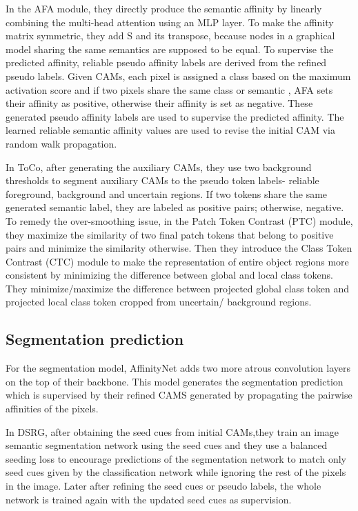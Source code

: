 In the AFA module, they directly produce the semantic affinity by linearly combining the multi-head attention using an MLP layer. To make the affinity matrix symmetric, they add S and its transpose, because  nodes in a graphical model sharing the same semantics are supposed to be equal. To supervise the predicted affinity, reliable pseudo affinity labels  are derived from the refined pseudo labels. Given CAMs, each pixel is assigned a class based on the maximum activation score and if two pixels share the same class or semantic , AFA sets their affinity as positive, otherwise their affinity is set as negative. These generated pseudo affinity labels are used to supervise the predicted affinity. The learned reliable semantic affinity values are used to revise the initial CAM via random walk propagation.

In ToCo, after generating the auxiliary CAMs, they use two background thresholds to segment auxiliary CAMs to the pseudo token labels- reliable foreground, background and uncertain regions. If two tokens share the same generated semantic label, they are labeled as positive pairs; otherwise, negative. To remedy the over-smoothing issue, in the Patch Token Contrast (PTC) module, they maximize the similarity of two final patch tokens that belong to positive pairs and minimize the similarity otherwise. Then they introduce the Class Token Contrast (CTC) module to make the representation of entire object regions more consistent by minimizing the difference between global and local class tokens. They minimize/maximize the difference between projected global class token and projected local class token cropped from uncertain/ background regions.


\subsection{Segmentation prediction}
\label{subsec:segmentation-prediction}

For the segmentation model, AffinityNet adds two more atrous convolution layers on the top of their backbone. This model generates the segmentation prediction which is supervised by their refined CAMS generated by propagating the pairwise affinities of the pixels.

In DSRG, after obtaining the seed cues from initial CAMs,they train an image semantic segmentation network using the seed cues and they use a balanced seeding loss to encourage predictions of the segmentation network to match only seed cues given by the classification network while ignoring the rest of the pixels in the image. Later after refining the seed cues or pseudo labels, the whole network is trained again with the updated seed cues as supervision.

